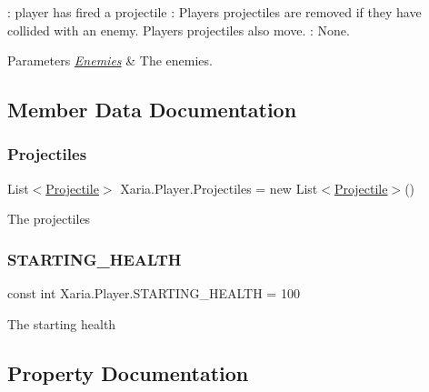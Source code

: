 \+: player has fired a projectile \+: Players projectiles are removed if they have collided with an enemy. Players projectiles also move. \+: None. 


\begin{DoxyParams}{Parameters}
{\em \hyperlink{namespaceXaria_1_1Enemies}{Enemies}} & The enemies.\\
\hline
\end{DoxyParams}


\subsection{Member Data Documentation}
\mbox{\label{classXaria_1_1Player_a643c5dbda599d86c01bde3cfd1749ae6}} 
\subsubsection{\texorpdfstring{Projectiles}{Projectiles}}
{\footnotesize\ttfamily List$<$\hyperlink{classXaria_1_1Projectile}{Projectile}$>$ Xaria.\+Player.\+Projectiles = new List$<$\hyperlink{classXaria_1_1Projectile}{Projectile}$>$()\hspace{0.3cm}{\ttfamily [private]}}



The projectiles 

\mbox{\label{classXaria_1_1Player_a454099110fca2d19ae08bc7174802018}} 
\subsubsection{\texorpdfstring{S\+T\+A\+R\+T\+I\+N\+G\+\_\+\+H\+E\+A\+L\+TH}{STARTING\_HEALTH}}
{\footnotesize\ttfamily const int Xaria.\+Player.\+S\+T\+A\+R\+T\+I\+N\+G\+\_\+\+H\+E\+A\+L\+TH = 100}



The starting health 



\subsection{Property Documentation}
\mbox{\label{classXaria_1_1Player_a4674dac15dedc7b171948e87393ee17b}} 
